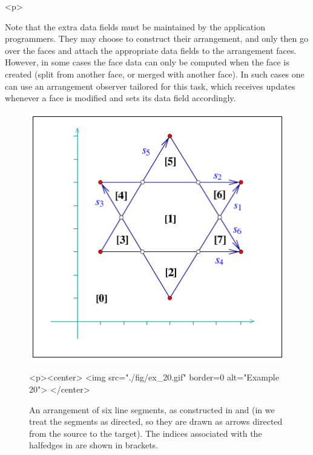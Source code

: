 \begin{ccHtmlOnly}<p>\end{ccHtmlOnly}
Note that the extra data fields must be maintained by the application
programmers. They may choose to construct their arrangement, and
only then go over the faces and attach the appropriate data fields to
the arrangement faces. However, in some cases the face data can only
be computed when the face is created (split from another face, or merged
with another face). In such cases one can use an arrangement observer
tailored for this task, which receives updates whenever a face is
modified and sets its data field accordingly.

\begin{figure}[!htp]
\begin{ccTexOnly}
  \begin{center}
  \includegraphics{Arrangement_2/fig/ex_20}
  \end{center}
\end{ccTexOnly}
\begin{ccHtmlOnly}
  <p><center>
  <img src="./fig/ex_20.gif" border=0 alt="Example 20">
  </center>
\end{ccHtmlOnly}
\caption{An arrangement of six line segments, as constructed in
 and  (in  we treat
the segments as directed, so they are drawn as arrows directed from the
source to the target). The indices associated with the halfedges in
 are shown in brackets.}
\label{arr_fig:ex_20}
\end{figure}

